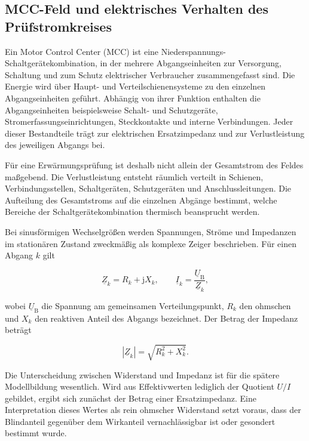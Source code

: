 \subsection{MCC-Feld und elektrisches Verhalten des Prüfstromkreises}
\label{sec:mcc_pruefstromkreis_grundlagen}

Ein Motor Control Center (MCC) ist eine Niederspannungs-
Schaltgerätekombination, in der mehrere Abgangseinheiten zur Versorgung,
Schaltung und zum Schutz elektrischer Verbraucher zusammengefasst sind. Die
Energie wird über Haupt- und Verteilschienensysteme zu den einzelnen
Abgangseinheiten geführt. Abhängig von ihrer Funktion enthalten die
Abgangseinheiten beispielsweise Schalt- und Schutzgeräte,
Stromerfassungseinrichtungen, Steckkontakte und interne Verbindungen. Jeder
dieser Bestandteile trägt zur elektrischen Ersatzimpedanz und zur
Verlustleistung des jeweiligen Abgangs bei.

Für eine Erwärmungsprüfung ist deshalb nicht allein der Gesamtstrom des Feldes
maßgebend. Die Verlustleistung entsteht räumlich verteilt in Schienen,
Verbindungsstellen, Schaltgeräten, Schutzgeräten und Anschlussleitungen. Die
Aufteilung des Gesamtstroms auf die einzelnen Abgänge bestimmt, welche
Bereiche der Schaltgerätekombination thermisch beansprucht werden.

Bei sinusförmigen Wechselgrößen werden Spannungen, Ströme und Impedanzen im
stationären Zustand zweckmäßig als komplexe Zeiger beschrieben. Für einen
Abgang \(k\) gilt

\begin{equation}
  \underline{Z}_k
  =
  R_k+\mathrm{j}X_k,
  \qquad
  \underline{I}_k
  =
  \frac{\underline{U}_{\mathrm{B}}}{\underline{Z}_k},
  \label{eq:abgangsimpedanz_strom}
\end{equation}

wobei \(\underline{U}_{\mathrm{B}}\) die Spannung am gemeinsamen
Verteilungspunkt, \(R_k\) den ohmschen und \(X_k\) den reaktiven Anteil des
Abgangs bezeichnet. Der Betrag der Impedanz beträgt

\begin{equation}
  \left|\underline{Z}_k\right|
  =
  \sqrt{R_k^2+X_k^2}.
  \label{eq:betrag_impedanz}
\end{equation}

Die Unterscheidung zwischen Widerstand und Impedanz ist für die spätere
Modellbildung wesentlich. Wird aus Effektivwerten lediglich der Quotient
\(U/I\) gebildet, ergibt sich zunächst der Betrag einer Ersatzimpedanz. Eine
Interpretation dieses Wertes als rein ohmscher Widerstand setzt voraus, dass
der Blindanteil gegenüber dem Wirkanteil vernachlässigbar ist oder gesondert
bestimmt wurde.

